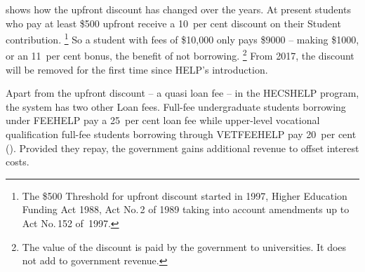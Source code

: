 \documentclass{grattan}
\begin{document}
 shows how the upfront discount has changed over the years.
At present students who pay at least \$500 upfront receive a 10~per cent discount on their \gls{Student contribution}.%
   \footnote{The \$500 \gls{Threshold} for upfront discount started in 1997, Higher Education Funding Act 1988, Act No.\,2 of 1989 taking into account amendments up to Act No.\,152 of~1997.} So a student with fees of \$10,000 only pays \$9000 -- making \$1000, or an 11~per cent bonus, the benefit of not borrowing.%
   \footnote{The value of the discount is paid by the government to universities. It does not add to government revenue.}
From 2017, the discount will be removed for the first time since \gls{HELP}'s introduction.

Apart from the upfront discount -- a quasi loan fee -- in the \gls{HECSHELP} program, the system has two other \gls{Loan fees}.
Full-fee undergraduate students borrowing under \gls{FEEHELP} pay a 25~per cent loan fee while upper-level vocational qualification full-fee students borrowing through \gls{VETFEEHELP} pay 20~per cent ().
Provided they repay, the government gains additional revenue to offset interest costs.
\end{document}
